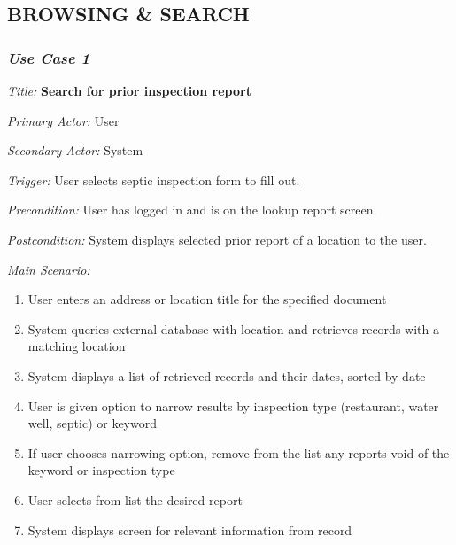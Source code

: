 \documentclass[twoside,letterpaper]{article}
\begin{document}
\subsection[BROWSING \& SEARCH]{\rmfamily\bfseries\color{black}
BROWSING \& SEARCH}

\subsubsection{\textit{Use Case 1}}

\textit{Title: }{\bfseries\color{black} Search for prior inspection report}

{\color{black} \textit{Primary Actor:} User}

{\color{black} \textit{Secondary Actor:} System}

{\color{black} \textit{Trigger:} User selects septic inspection form to fill out.}

{\color{black} \textit{Precondition:} User has logged in and is on the lookup report screen.}

{\color{black} \textit{Postcondition:} System displays selected prior report of a location to the user.}
\newline

{\color{black} \textit{Main Scenario:}}
\begin{enumerate}
\item User enters an address or location title for the specified document
\item System queries external database with location and retrieves records with a matching location
\item System displays a list of retrieved records and their dates, sorted by date
\item User is given option to narrow results by inspection type (restaurant, water well, septic) or keyword
\item If user chooses narrowing option, remove from the list any reports void of the keyword or inspection type
\item User selects from list the desired report
\item System displays screen for relevant information from record
\end{enumerate}
\end{document}
